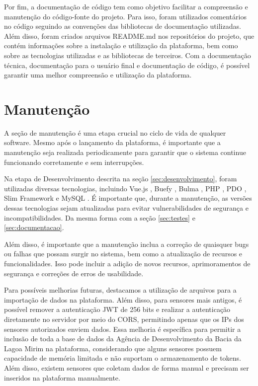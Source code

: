 \documentclass[tcc,capa]{texufpel}
\begin{document}
Por fim, a documentação de código tem como objetivo facilitar a compreensão e manutenção do código-fonte do projeto. Para isso, foram utilizados comentários no código seguindo as convenções das bibliotecas de documentação utilizadas. Além disso, foram criados arquivos README.md nos repositórios do projeto, que contém informações sobre a instalação e utilização da plataforma, bem como sobre as tecnologias utilizadas e as bibliotecas de terceiros. Com a documentação técnica, documentação para o usuário final e documentação de código, é possível garantir uma melhor compreensão e utilização da plataforma.
\section{Manutenção}
\label{sec:manutencao}
A seção de manutenção é uma etapa crucial no ciclo de vida de qualquer software. Mesmo após o lançamento da plataforma, é importante que a manutenção seja realizada periodicamente para garantir que o sistema continue funcionando corretamente e sem interrupções. 

Na etapa de Desenvolvimento descrita na seção \ref{sec:desenvolvimento}, foram utilizadas diversas tecnologias, incluindo Vue.js \cite{vue:2014}, Buefy \cite{buefy:2022}, Bulma \cite{bulma:2022}, PHP \cite{PHP:2022}, PDO \cite{PDO:2022}, Slim Framework \cite{slim:2023} e MySQL \cite{mysql:2022}. É importante que, durante a manutenção, as versões dessas tecnologias sejam atualizadas para evitar vulnerabilidades de segurança e incompatibilidades. Da mesma forma com a seção \ref{sec:testes} e \ref{sec:documentacao}.

Além disso, é importante que a manutenção inclua a correção de quaisquer bugs ou falhas que possam surgir no sistema, bem como a atualização de recursos e funcionalidades. Isso pode incluir a adição de novos recursos, aprimoramentos de segurança e correções de erros de usabilidade.

Para possíveis melhorias futuras, destacamos a utilização de arquivos para a importação de dados na plataforma. Além disso, para sensores mais antigos, é possível remover a autenticação JWT de 256 bits e realizar a autenticação diretamente no servidor por meio do CORS, permitindo apenas que os IPs dos sensores autorizados enviem dados. Essa melhoria é específica para permitir a inclusão de toda a base de dados da Agência de Desenvolvimento da Bacia da Lagoa Mirim na plataforma, considerando que alguns sensores possuem capacidade de memória limitada e não suportam o armazenamento de tokens. Além disso, existem sensores que coletam dados de forma manual e precisam ser inseridos na plataforma manualmente.
\end{document}
